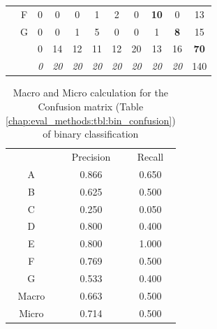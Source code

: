 \begin{table}[H]
\begin{tabular}{c c c c c c c c c c c}
		& \multicolumn{1}{|c}{F} & \multicolumn{1}{|c}{0} & \multicolumn{1}{c}{0} & \multicolumn{1}{c}{0} & \multicolumn{1}{c}{1} & \multicolumn{1}{c}{2} & \multicolumn{1}{c}{0} & \multicolumn{1}{c}{\textbf{10}} & \multicolumn{1}{c|}{0} & 13 \\
		& \multicolumn{1}{|c}{G} & \multicolumn{1}{|c}{0} & \multicolumn{1}{c}{0} & \multicolumn{1}{c}{1} & \multicolumn{1}{c}{5} & \multicolumn{1}{c}{0} & \multicolumn{1}{c}{0} & \multicolumn{1}{c}{1} & \multicolumn{1}{c|}{\textbf{8}} & 15 \\
		\cline{2-10}
		& & 0 & 14 & 12 & 11 & 12 & 20 & 13 & 16 & \textbf{70}\\
		\cline{3-10}
		& & \textit{0} & \textit{20} & \textit{20} & \textit{20} & \textit{20} & \textit{20} & \textit{20} & \textit{20} & 140\\
	\end{tabular}
\end{table}


\begin{table}[H]
	\center
	\caption{Macro and Micro calculation for the Confusion matrix (Table \ref{chap:eval_methods:tbl:bin_confusion}) of binary classification}\label{chap:eval_methods:tbl:bin_macro_vs_micro}
	\begin{tabular}{l l l}
		\cline{2-3}
		& \multicolumn{1}{|c}{Precision} & \multicolumn{1}{c|}{Recall}\\
		\cline{1-3}
		\multicolumn{1}{|c}{A} & \multicolumn{1}{|c}{0.866} & \multicolumn{1}{c|}{0.650}\\
		\multicolumn{1}{|c}{B} & \multicolumn{1}{|c}{0.625} & \multicolumn{1}{c|}{0.500}\\
		\multicolumn{1}{|c}{C} & \multicolumn{1}{|c}{0.250} & \multicolumn{1}{c|}{0.050}\\
		\multicolumn{1}{|c}{D} & \multicolumn{1}{|c}{0.800} & \multicolumn{1}{c|}{0.400}\\
		\multicolumn{1}{|c}{E} & \multicolumn{1}{|c}{0.800} & \multicolumn{1}{c|}{1.000}\\
		\multicolumn{1}{|c}{F} & \multicolumn{1}{|c}{0.769} & \multicolumn{1}{c|}{0.500}\\
		\multicolumn{1}{|c}{G} & \multicolumn{1}{|c}{0.533} & \multicolumn{1}{c|}{0.400}\\
		\cline{1-3}
		\multicolumn{1}{|c}{Macro} & \multicolumn{1}{|c}{0.663} & \multicolumn{1}{c|}{0.500}\\
		\multicolumn{1}{|c}{Micro} & \multicolumn{1}{|c}{0.714} & \multicolumn{1}{c|}{0.500}\\
		\cline{1-3}
	\end{tabular}
\end{table}


